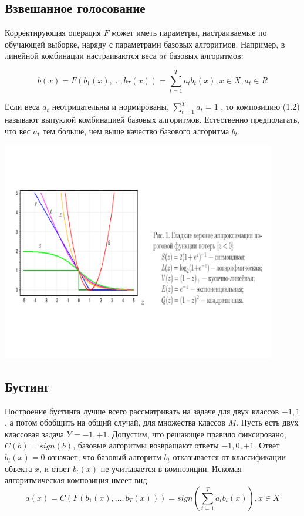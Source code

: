 \subsection{Взвешанное голосование}

Корректирующая операция $F$ может иметь параметры, настраиваемые по обучающей выборке, наряду с параметрами базовых алгоритмов. Например, в линейной комбинации настраиваются веса $at$ базовых алгоритмов:

\begin{equation}
	b(x)=F(b_1(x), \dotsc ,b_T(x)) = \sum_{t=1}^{T} a_tb_t(x),  x \in X,  a_t \in R
\end{equation}

Если веса $a_t$ неотрицательны и нормированы, $\sum_{t=1}^{T} a_t =1$ , то композицию (1.2) называют выпуклой комбинацией базовых алгоритмов. Естественно предполагать, что вес $a_t$ тем больше, чем выше качество базового алгоритма $b_t$.

\includegraphics[width=0.9\textwidth]{images/upper_approximations.png}

\subsection{Бустинг}

Построение бустинга лучше всего рассматривать на задаче для двух классов ${-1,1}$, а потом обобщить на общий случай, для множества классов $M$. Пусть есть двух классовая задача $Y={-1,+1}$. Допустим, что решающее правило фиксировано, $C(b) = sign(b)$, базовые алгоритмы возвращают ответы $-1,0,+1$. Ответ $b_t(x) = 0$ означает, что базовый алгоритм $b_t$ отказывается от классификации объекта $x$, и ответ $b_t(x)$ не учитывается в композиции.
Искомая алгоритмическая композиция имеет вид:
\begin{equation}
	a(x)=C(F(b_1(x),\dotsc,b_T(x)))=sign(\sum_{t=1}^{T} a_tb_t(x)), x \in X
\end{equation}

